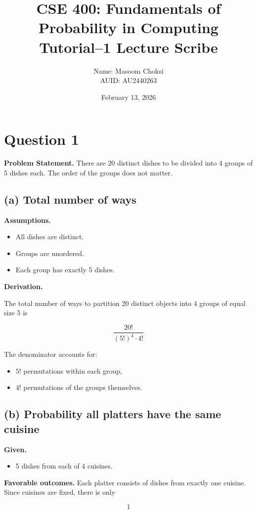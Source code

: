 \documentclass[12pt]{article}
\title{CSE 400: Fundamentals of Probability in Computing \\ \large Tutorial--1 Lecture Scribe}
\author{Name: Masoom Choksi \\ AUID: AU2440263}
\date{February 13, 2026}
\begin{document}
\maketitle

\section*{Question 1}

\textbf{Problem Statement.}  
There are 20 distinct dishes to be divided into 4 groups of 5 dishes each. The order of the groups does not matter.

\subsection*{(a) Total number of ways}

\textbf{Assumptions.}
\begin{itemize}
\item All dishes are distinct.
\item Groups are unordered.
\item Each group has exactly 5 dishes.
\end{itemize}

\textbf{Derivation.}

The total number of ways to partition 20 distinct objects into 4 groups of equal size 5 is

\[
\frac{20!}{(5!)^4 \cdot 4!}
\]

The denominator accounts for:
\begin{itemize}
\item $5!$ permutations within each group,
\item $4!$ permutations of the groups themselves.
\end{itemize}

\subsection*{(b) Probability all platters have the same cuisine}

\textbf{Given.}
\begin{itemize}
\item 5 dishes from each of 4 cuisines.
\end{itemize}

\textbf{Favorable outcomes.}  
Each platter consists of dishes from exactly one cuisine. Since cuisines are fixed, there is only

\[
1
\]
\end{document}
